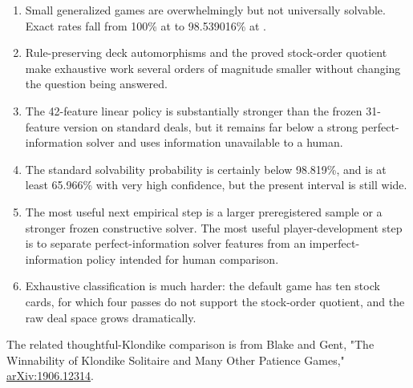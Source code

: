 \documentclass[11pt]{article}
\begin{document}
\begin{enumerate}
  \item Small generalized games are overwhelmingly but not universally solvable. Exact rates fall from 100\% at \texttt{} to 98.539016\% at \texttt{}.
  \item Rule-preserving deck automorphisms and the proved stock-order quotient make exhaustive work several orders of magnitude smaller without changing the question being answered.
  \item The 42-feature linear policy is substantially stronger than the frozen 31-feature version on standard deals, but it remains far below a strong perfect-information solver and uses information unavailable to a human.
  \item The standard solvability probability is certainly below 98.819\%, and is at least 65.966\% with very high confidence, but the present interval is still wide.
  \item The most useful next empirical step is a larger preregistered sample or a stronger frozen constructive solver. The most useful player-development step is to separate perfect-information solver features from an imperfect-information policy intended for human comparison.
  \item Exhaustive \texttt{} classification is much harder: the default game has ten stock cards, for which four passes do not support the stock-order quotient, and the raw deal space grows dramatically.
\end{enumerate}

The related thoughtful-Klondike comparison is from Blake and Gent, "The Winnability of Klondike Solitaire and Many Other Patience Games," \href{https://arxiv.org/abs/1906.12314}{arXiv:1906.12314}.
\end{document}

